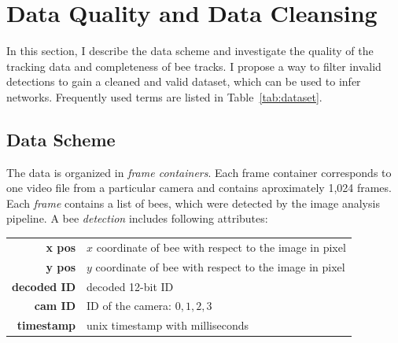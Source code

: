 \section{Data Quality and Data Cleansing}
In this section, I describe the data scheme and investigate the quality of the tracking data and completeness of bee tracks. I propose a way to filter invalid detections to gain a cleaned and valid dataset, which can be used to infer networks. Frequently used terms are listed in Table~\ref{tab:dataset}.

\subsection{Data Scheme}
\label{subsec:scheme}

The data is organized in \emph{frame containers}.
Each frame container corresponds to one video file from a particular camera and contains aproximately 1,024 frames.
Each \emph{frame} contains a list of bees, which were detected by the image analysis pipeline.
A bee \emph{detection} includes following attributes:\\

\begin{table}[!h]
\small
\centering
\begin{tabular}{rl}
\textbf{x pos} & $x$ coordinate of bee with respect to the image in pixel \vspace{2mm}\\
\textbf{y pos} & $y$ coordinate of bee with respect to the image in pixel \vspace{2mm}\\
\textbf{decoded ID} & decoded 12-bit ID \vspace{2mm}\\
\textbf{cam ID} & ID of the camera: ${0,1,2,3}$ \vspace{2mm}\\
\textbf{timestamp} & unix timestamp with milliseconds\\
\end{tabular}
\end{table}

